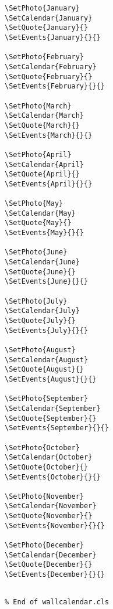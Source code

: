 \documentclass[11pt,oneside]{memoir-article}
\begin{document}
\begin{verbatim}
\SetPhoto{January}
\SetCalendar{January}
\SetQuote{January}{}
\SetEvents{January}{}{}

\SetPhoto{February}
\SetCalendar{February}
\SetQuote{February}{}
\SetEvents{February}{}{}

\SetPhoto{March}
\SetCalendar{March}
\SetQuote{March}{}
\SetEvents{March}{}{}

\SetPhoto{April}
\SetCalendar{April}
\SetQuote{April}{}
\SetEvents{April}{}{}

\SetPhoto{May}
\SetCalendar{May}
\SetQuote{May}{}
\SetEvents{May}{}{}

\SetPhoto{June}
\SetCalendar{June}
\SetQuote{June}{}
\SetEvents{June}{}{}

\SetPhoto{July}
\SetCalendar{July}
\SetQuote{July}{}
\SetEvents{July}{}{}

\SetPhoto{August}
\SetCalendar{August}
\SetQuote{August}{}
\SetEvents{August}{}{}

\SetPhoto{September}
\SetCalendar{September}
\SetQuote{September}{}
\SetEvents{September}{}{}

\SetPhoto{October}
\SetCalendar{October}
\SetQuote{October}{}
\SetEvents{October}{}{}

\SetPhoto{November}
\SetCalendar{November}
\SetQuote{November}{}
\SetEvents{November}{}{}

\SetPhoto{December}
\SetCalendar{December}
\SetQuote{December}{}
\SetEvents{December}{}{}
\end{verbatim}

\begin{verbatim}

% End of wallcalendar.cls
\end{verbatim}
\end{document}
